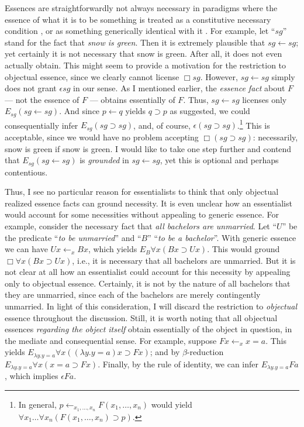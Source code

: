 \documentclass[12pt]{article}
\begin{document}
\par
Essences are straightforwardly not always necessary in paradigms where the essence of what it is to be something is treated as a constitutive necessary condition \citep{Fine2015-FINUFF}, or as something generically identical with it \citep{Correia2017-CORGEA}. For example, let ``$sg$'' stand for the fact that \textit{snow is green}. Then it is extremely plausible that $sg \bm{\leftarrow} sg$; yet certainly it is not necessary that snow is green. After all, it does not even actually obtain. This might seem to provide a motivation for the restriction to objectual essence, since we clearly cannot license $\Box sg$. However, $sg \bm{\leftarrow} sg$ simply does not grant $\epsilon sg$ in our sense. As I mentioned earlier, the \textit{essence fact} about $F$ --- not the essence of $F$ --- obtains essentially of $F$. Thus, $sg \bm{\leftarrow} sg$ licenses only $E_{sg} (sg \bm{\leftarrow} sg)$. And since $p \bm{\leftarrow} q$ yields $q \supset p$ as \citet[299]{Fine2015-FINUFF} suggested, we could consequentially infer $E_{sg} (sg \supset sg)$, and, of course, $\epsilon (sg \supset sg)$.\footnote{
    In general, $p \bm{\leftarrow}_{x_1, \dots , x_n} F(x_1, \dots, x_n)$ would yield $\forall x_1 \dots \forall x_n (F(x_1, \dots, x_n) \supset p)$. 
} This is acceptable, since we would have no problem accepting $\Box (sg \supset sg)$: necessarily, snow is green if snow is green. I would like to take one step further and contend that $E_{sg} (sg \bm{\leftarrow} sg)$ is \textit{grounded} in $sg \bm{\leftarrow} sg$, yet this is optional and perhaps contentious. 
\par
Thus, I see no particular reason for essentialists to think that only objectual realized essence facts can ground necessity. It is even unclear how an essentialist would account for some necessities without appealing to generic essence. For example, consider the necessary fact that \textit{all bachelors are unmarried}. Let ``$U$'' be the predicate ``\textit{to be unmarried}'' and ``$B$'' ``\textit{to be a bachelor}''. With generic essence we can have $Ux \bm{\leftarrow}_x Bx$, which yields $E_B \forall x (Bx \supset Ux)$. This would ground $\Box \forall x (Bx \supset Ux)$, i.e., it is necessary that all bachelors are unmarried. But it is not clear at all how an essentialist could account for this necessity by appealing only to objectual essence. Certainly, it is not by the nature of all bachelors that they are unmarried, since each of the bachelors are merely contingently unmarried. In light of this consideration, I will discard the restriction to \textit{objectual} essence throughout the discussion. Still, it is worth noting that all objectual essences \textit{regarding the object itself} obtain essentially of the object in question, in the mediate and consequential sense. For example, suppose $Fx \bm{\leftarrow}_x x=a$. This yields $E_{\lambda y. y=a} \forall x ((\lambda y. y=a)x \supset Fx)$; and by $\beta$-reduction $E_{\lambda y. y=a} \forall x (x=a \supset Fx)$. Finally, by the rule of identity, we can infer $E_{\lambda y. y=a} Fa$, which implies $\epsilon Fa$. 
\end{document}
